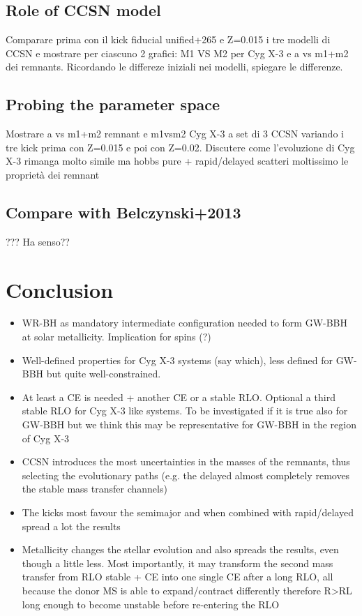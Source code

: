 \documentclass[a4paper,titlepage]{book}     	%
\begin{document}
\section{Role of CCSN model}
Comparare prima con il kick fiducial unified+265 e Z=0.015 i tre modelli di CCSN e mostrare per ciascuno 2 grafici: M1 VS M2 per Cyg X-3 e a vs m1+m2 dei remnants. Ricordando le differeze iniziali nei modelli, spiegare le differenze.


\section{Probing the parameter space}
Mostrare a vs m1+m2 remnant e m1vsm2 Cyg X-3 a set di 3 CCSN variando i tre kick prima con Z=0.015 e poi con Z=0.02. Discutere come l'evoluzione di Cyg X-3 rimanga molto simile ma hobbs pure + rapid/delayed scatteri moltissimo le proprietà dei remnant





\section{Compare with Belczynski+2013}
??? Ha senso??




\chapter{Conclusion}
\begin{itemize}
	\item WR-BH as mandatory intermediate configuration needed to form GW-BBH at solar metallicity. Implication for spins (?)
	\item Well-defined properties for Cyg X-3 systems (say which), less defined for GW-BBH but quite well-constrained.
	\item At least a CE is needed + another CE or a stable RLO. Optional a third stable RLO for Cyg X-3 like systems. To be investigated if it is true also for GW-BBH but we think this may be representative for GW-BBH in the region of Cyg X-3
	\item CCSN introduces the most uncertainties in the masses of the remnants, thus selecting the evolutionary paths (e.g. the delayed almost completely removes the stable mass transfer channels)
	\item The kicks most favour the semimajor and when combined with rapid/delayed spread a lot the results
	\item Metallicity changes the stellar evolution and also spreads the results, even though a little less. Most importantly, it may transform the second mass transfer from RLO stable + CE into one single CE after a long RLO, all because the donor MS is able to expand/contract differently therefore R>RL long enough to become unstable before re-entering the RLO
\end{itemize}
\end{document}
